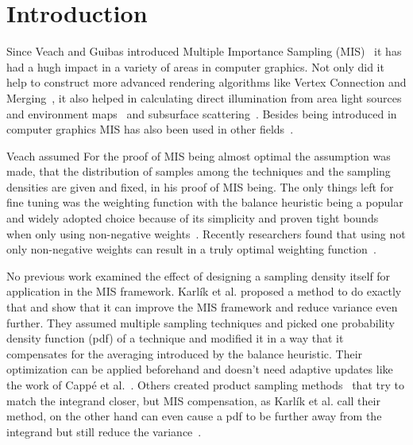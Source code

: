 \chapter{Introduction}
\label{ch:introduction}
Since Veach and Guibas introduced Multiple Importance Sampling (MIS)~\cite{veach_guibas}
it has had a hugh impact in a variety of areas in computer graphics.
Not only did it help to construct more advanced rendering algorithms like Vertex Connection and Merging~\cite{vcm},
it also helped in calculating direct illumination from area light sources and environment maps~\cite[Chapter~14.3]{pbr-book}
and subsurface scattering~\cite{King}.
Besides being introduced in computer graphics MIS has also been used in other fields~\cite{he}.

Veach assumed  For the proof of MIS being almost optimal the assumption was made,
that the distribution of samples among the techniques and the sampling densities are given and fixed,
in his proof of MIS being.
The only things left for fine tuning was the weighting function
with the balance heuristic being a popular and widely adopted choice because of its simplicity
and proven tight bounds when only using non-negative weights~\cite[Theorem~9.2]{veach-thesis}.
Recently researchers found that using not only non-negative weights can result in a truly optimal weighting function~\cite{Kondapaneni2019}.



No previous work examined the effect of designing a sampling density itself for application in the MIS framework.
Karl\'ik et al. proposed a method to do exactly that and show that it can improve the MIS framework and reduce variance even further.
They assumed multiple sampling techniques and picked one probability density function (pdf) of a technique
and modified it in a way that it compensates for the averaging introduced by the balance heuristic.
Their optimization can be applied beforehand and doesn't need adaptive updates like the work of Capp\'e et al.~\cite{Cappe2008}.
Others created product sampling methods~\cite{Herholz} that try to match the integrand closer,
but MIS compensation, as Karl\'ik et al. call their method,
on the other hand can even cause a pdf to be further away from the integrand but still reduce the variance~\cite{Karlik2019}.


